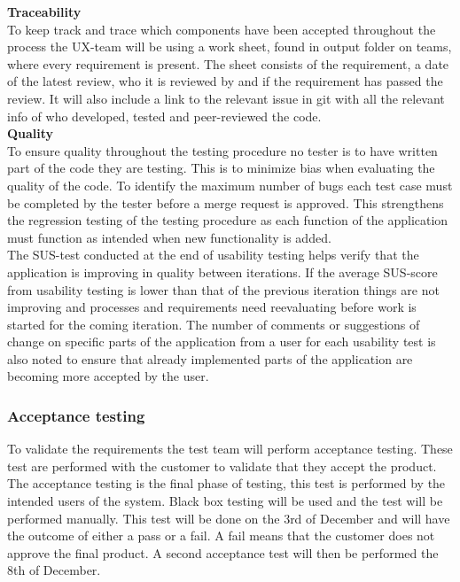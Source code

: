 \noindent\textbf{Traceability}\\
To keep track and trace which components have been accepted throughout the process the UX-team will be using a work sheet, found in output folder on teams, where every requirement is present. The sheet consists of the requirement, a date of the latest review, who it is reviewed by and if the requirement has passed the review. It will also include a link to the relevant issue in git with all the relevant info of who developed, tested and peer-reviewed the code.\\

\noindent\textbf{Quality}\\
To ensure quality throughout the testing procedure no tester is to have written part of the code they are testing. This is to minimize bias when evaluating the quality of the code. To identify the maximum number of bugs each test case must be completed by the tester before a merge request is approved. This strengthens the regression testing of the testing procedure as each function of the application must function as intended when new functionality is added. \\

\noindent The SUS-test conducted at the end of usability testing helps verify that the application is improving in quality between iterations. If the average SUS-score from usability testing is lower than that of the previous iteration things are not improving and processes and requirements need reevaluating before work is started for the coming iteration. The number of comments or suggestions of change on specific parts of the application from a user for each usability test is also noted to ensure that already implemented parts of the application are becoming more accepted by the user.\\

\subsubsection{Acceptance testing}
To validate the requirements the test team will perform acceptance testing. These test are performed with the customer to validate that they accept the product. The acceptance testing is the final phase of testing, this test is performed by the intended users of the system. Black box testing will be used and the test will be performed manually. This test will be done on the 3rd of December and will have the outcome of either a pass or a fail. A fail means that the customer does not approve the final product. A second acceptance test will then be performed the 8th of December. \newline

